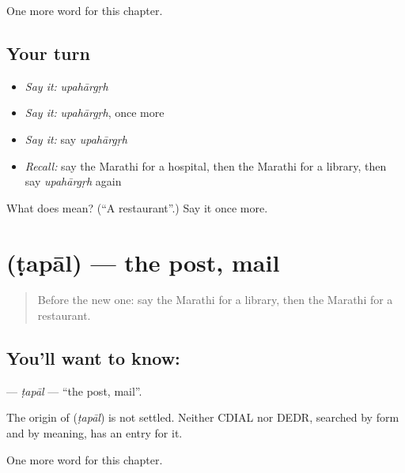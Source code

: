 \begin{grammarlens}[title={What you've built}]
One more word for this chapter.
\end{grammarlens}

\subsection*{Your turn}
\begin{itemize}
\raggedright
  \item \emph{Say it:} \emph{upahārgṛh}
  \item \emph{Say it:} \emph{upahārgṛh}, once more
  \item \emph{Say it:} say \emph{upahārgṛh}
  \item \emph{Recall:} say the Marathi for a hospital, then the Marathi for a library, then say \emph{upahārgṛh} again
\end{itemize}

\begin{tcolorbox}[breakable,colback=teal!4,colframe=teal!35!black,title={Before you move on}]
What does  mean? (\textquotedblleft{}A restaurant\textquotedblright{}.) Say it once more.
\end{tcolorbox}
\section[\texorpdfstring{\mr{टपाल} (ṭapāl)}{टपाल (ṭapāl)}]{ (ṭapāl) — the post, mail}

\label{lesson:MR-C129-tapal}



\begin{quote}
Before the new one: say the Marathi for a library, then the Marathi for a restaurant.
\end{quote}

\subsection*{You'll want to know: }
\textbf{} — \emph{ṭapāl} — \textquotedblleft{}the post, mail\textquotedblright{}.

\begin{cousinweb}
The origin of \textbf{} (\emph{ṭapāl}) is not settled. Neither CDIAL nor DEDR, searched by form and by meaning, has an entry for it.
\end{cousinweb}

\begin{grammarlens}[title={What you've built}]
One more word for this chapter.
\end{grammarlens}

